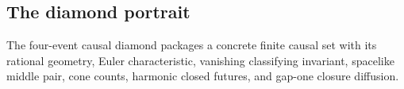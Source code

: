 \subsection{The diamond portrait}

\begin{theorem}\label{thm:diamond-spectral-portrait}\leanok{}
The four-event causal diamond packages a concrete finite causal set with its
rational geometry, Euler characteristic, vanishing classifying invariant,
spacelike middle pair, cone counts, harmonic closed futures, and gap-one
closure diffusion.
\end{theorem}
